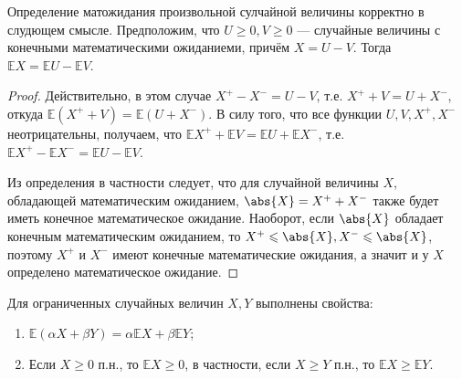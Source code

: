 \begin{proposal*}
    Определение матожидания произвольной сулчайной величины корректно в слудющем смысле. Предположим, что $U \geqslant 0,
    V \geqslant 0$ --- случайные величины с конечными математическими ожиданиеми, причём $X = U - V$. Тогда $\mathbb{E}X =
    \mathbb{E}U - \mathbb{E}V$.
\end{proposal*}

\begin{proof}
    Действительно, в этом случае $X^+ - X^- = U - V$, т.е. $X^+ + V = U + X^-$, откуда $\mathbb{E}(X^+ + V) = \mathbb{E}
    (U + X^-)$. В силу того, что все функции $U, V, X^+, X^-$ неотрицательны, получаем, что $\mathbb{E}X^+ + \mathbb{E}V =
    \mathbb{E}U + \mathbb{E}X^-$, т.е. $\mathbb{E}X^+ - \mathbb{E}X^- = \mathbb{E}U - \mathbb{E}V$.

    Из определения в частности следует, что для случайной величины $X$, обладающей математическим ожиданием,
    $\abs{X} = X^+ + X^-$ также будет иметь конечное математическое ожидание. Наоборот, если $\abs{X}$ обладает
    конечным математическим ожиданием, то $X^+ \leqslant \abs{X}, X^- \leqslant \abs{X}$, поэтому $X^+$ и $X^-$
    имеют конечные математические ожидания, а значит и у $X$ определено математическое ожидание.
\end{proof}

\begin{proposal*}
    Для ограниченных случайных величин $X, Y$ выполнены свойства:
    \begin{enumerate}
        \item $\mathbb{E}(\alpha X+\beta Y)=\alpha\mathbb{E}X+\beta\mathbb{E}Y$;
        \item Если $X \geqslant 0$ п.н., то $\mathbb{E} X \geqslant 0$, в частности, если $X \geqslant Y$ п.н., то $\mathbb{E} X \geqslant \mathbb{E} Y$.
    \end{enumerate}
\end{proposal*}

